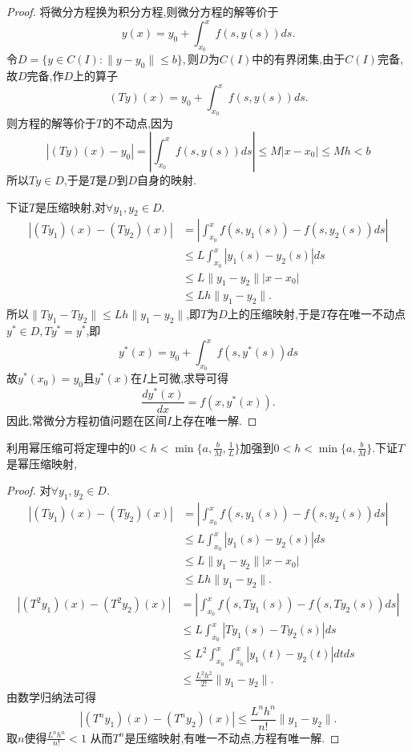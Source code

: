 \documentclass[lang=cn,18pt]{elegantbook}
\begin{document}
\begin{proof}
    将微分方程换为积分方程,则微分方程的解等价于
    $$y(x)=y_0 +\int_{x_0}^{x}f(s,y(s))ds.$$
    令$D=\{y \in C(I):\|y-y_0\| \leqslant b\},$则$D$为$C(I)$中的有界闭集,由于$C(I)$完备,故$D$完备,作$D$上的算子
    $$(Ty)(x)=y_0 + \int_{x_0}^{x}f(s,y(s))ds.$$
    则方程的解等价于$T$的不动点,因为
    $$|(Ty)(x)-y_0|=\left|\int_{x_0}^{x}f(s,y(s))ds\right| \leqslant M|x-x_0| \leqslant Mh < b$$
    所以$Ty \in D$,于是$T$是$D$到$D$自身的映射.

    下证$T$是压缩映射,对$\forall y_1,y_2 \in D$.
    \begin{align*}
        |(Ty_1)(x)-(Ty_2)(x)| & = \left|\int_{x_0}^{x}f(s,y_1(s))-f(s,y_2(s))ds\right| \\
        & \leqslant L\int_{x_0}^{x}|y_1(s) -y_2(s)|ds \\
        & \leqslant L\|y_1-y_2\| |x-x_0|  \\
        & \leqslant Lh \|y_1 -y_2 \|.
    \end{align*}
    所以$\|Ty_1 -Ty_2\| \leqslant Lh \|y_1 -y_2\|$,即$T$为$D$上的压缩映射,于是$T$存在唯一不动点$y^* \in D,Ty^* = y^*$,即
    $$y^*(x)=y_0 +\int_{x_0}^{x}f(s,y^*(s))ds$$
    故$y^*(x_0)=y_0$且$y^*(x)$在$I$上可微,求导可得
    $$\frac{dy^*(x)}{dx}=f(x,y^*(x)).$$
    因此,常微分方程初值问题在区间$I$上存在唯一解.
    
\end{proof}
\begin{note}
    利用幂压缩可将定理中的$0 < h < \min \{a,\frac{b}{M},\frac{1}{L}\}$加强到$0 < h < \min\{a,\frac{b}{M}\}$.下证$T$是幂压缩映射,
    \begin{proof}
        对$\forall y_1,y_2 \in D$.
    \begin{align*}
        |(Ty_1)(x)-(Ty_2)(x)| & = \left|\int_{x_0}^{x}f(s,y_1(s))-f(s,y_2(s))ds \right| \\
        & \leqslant L\int_{x_0}^{x}|y_1(s) -y_2(s)|ds \\
        & \leqslant L\|y_1-y_2\| |x-x_0|  \\
        & \leqslant Lh \|y_1 -y_2 \|.
    \end{align*}
    \begin{align*}
        |(T^2y_1)(x)-(T^2y_2)(x)| & = \left|\int_{x_0}^{x}f(s,Ty_1(s))-f(s,Ty_2(s))ds \right| \\
        & \leqslant L\int_{x_0}^{x}|Ty_1(s) -Ty_2(s)|ds \\
        & \leqslant L^2 \int_{x_0}^{x}\int_{x_0}^{x}|y_1(t)-y_2(t)|dt ds \\
        & \leqslant \frac{L^2 h^2}{2!} \|y_1 -y_2\|.
    \end{align*}
    由数学归纳法可得
    $$|(T^n y_1)(x)-(T^n y_2)(x)|\leqslant \frac{L^n h^n}{n!}\|y_1-y_2\|.$$
    取$n$使得$\frac{L^n  h^n}{n!} < 1$
    从而$T^n$是压缩映射,有唯一不动点,方程有唯一解.
    \end{proof}
    
\end{note}
\end{document}
